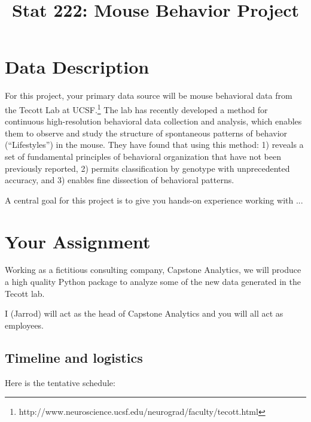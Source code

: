 \documentclass[11pt, oneside]{article}   	%
\title{Stat 222: Mouse Behavior Project}
\date{}							%
\begin{document}
\maketitle

\section{Data Description}

For this project, your primary data source will be mouse behavioral data from
the Tecott Lab at
UCSF.\footnote{http://www.neuroscience.ucsf.edu/neurograd/faculty/tecott.html}
The lab has recently developed a method for continuous high-resolution
behavioral data collection and analysis, which enables them to observe and
study the structure of spontaneous patterns of behavior (``Lifestyles'') in the
mouse.  They have found that using this method: 1) reveals a set of fundamental
principles of behavioral organization that have not been previously reported,
2) permits classification by genotype with unprecedented accuracy, and 3)
enables fine dissection of behavioral patterns.

A central goal for this project is to give you hands-on experience working
with ...

\section{Your Assignment}

Working as a fictitious consulting company, Capstone Analytics, we will produce
a high quality Python package to analyze some of the new data generated in the
Tecott lab.

I (Jarrod) will act as the head of Capstone Analytics and you will all act as
employees. 

\subsection*{Timeline and logistics}

Here is the tentative schedule:
\end{document}
